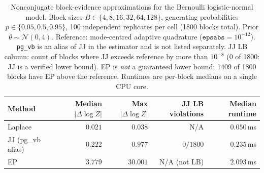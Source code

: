 \begin{table}[ht]
\centering
\caption{Nonconjugate block-evidence approximations for the
Bernoulli logistic-normal model. Block sizes $B\in\{4,8,16,32,64,128\}$,
generating probabilities $p\in\{0.05,0.5,0.95\}$, 100 independent replicates per cell
(1800 blocks total). Prior $\theta\sim\mathcal{N}(0,4)$. Reference: mode-centred
adaptive quadrature ($\texttt{epsabs}=10^{-12}$). \texttt{pg\_vb} is an alias of JJ
in the estimator and is not listed separately. JJ LB column: count of blocks where
JJ exceeds reference by more than $10^{-8}$ (0 of 1800: JJ is a verified lower bound).
EP is \emph{not} a guaranteed lower bound; 1409 of 1800 blocks have EP above the
reference. Runtimes are per-block medians on a single CPU core.}
\label{tab:planned-nonconjugate-paper}
\begin{tabular}{lrrrr}
\toprule
Method & Median $|\Delta\log Z|$ & Max $|\Delta\log Z|$ & JJ LB violations & Median runtime \\
\midrule
Laplace        & $0.021$ & $0.038$ & N/A        & $0.050$\,ms \\
JJ (pg\_vb alias) & $0.222$ & $0.977$ & $0/1800$ & $0.235$\,ms \\
EP             & $3.779$ & $30.001$ & N/A (not LB) & $2.093$\,ms \\
\bottomrule
\end{tabular}
\end{table}
